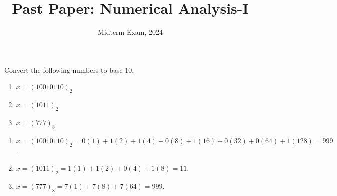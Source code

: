 \documentclass[11pt]{penrose}
\title{Past Paper: Numerical Analysis-I}
\subtitle{Midterm Exam, 2024}
\begin{document}
\maketitle
\warningtext

\begin{problem}{1}
    Convert the following numbers to base $10$.
    \begin{enumerate}[label=(\alph*)]
        \item $x = (10 010 110)_2$
        \item $x = (1 011)_2$
        \item $x = (777)_8$
    \end{enumerate}

    \solution \phantom{}
    \begin{enumerate}[label=(\alph*)]
        \item $x = (10 010 110)_2 = 0(1) + 1(2) + 1(4) + 0(8) + 1(16) + 0(32) + 0(64) + 1(128) = 999$.
        \item $x = (1 011)_2 = 1(1) + 1(2) + 0(4) + 1(8) = 11$.
        \item $x = (777)_8 = 7(1) + 7(8) + 7(64) = 999$.
    \end{enumerate}
\end{problem}
\end{document}

